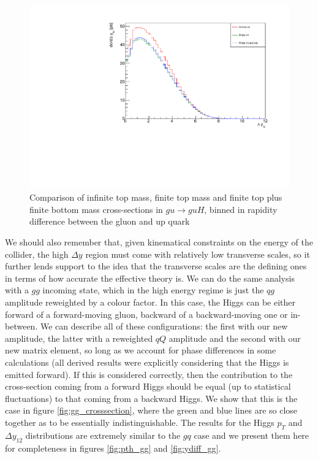 \begin{figure}[H]
\centering
\includegraphics[scale=0.75]{Images/ydiff_gu.pdf}
\caption{Comparison of infinite top mass, finite top mass and finite top plus finite bottom mass cross-sections in $gu \to guH$, binned in rapidity difference between the gluon and up quark}
\label{fig:higgs_ydiff}
\end{figure}

We should also remember that, given kinematical constraints on the energy of the collider, the high $\Delta y$ region must come with relatively low transverse scales, so it further lends support to the idea that the transverse scales are the defining ones in terms of how accurate the effective theory is. We can do the same analysis with a $gg$ incoming state, which in the high energy regime is just the $qg$ amplitude reweighted by a colour factor. In this case, the Higgs can be either forward of a forward-moving gluon, backward of a backward-moving one or in-between. We can describe all of these configurations: the first with our new amplitude, the latter with a reweighted $qQ$ amplitude and the second with our new matrix element, so long as we account for phase differences in some calculations (all derived results were explicitly considering that the Higgs is emitted forward). If this is considered correctly, then the contribution to the cross-section coming from a forward Higgs should be equal (up to statistical fluctuations) to that coming from a backward Higgs. We show that this is the case in figure \ref{fig:gg_crosssection}, where the green and blue lines are so close together as to be essentially indistinguishable. The results for the Higgs $p_T$ and $\Delta y_{12}$ distributions are extremely similar to the $gq$ case and we present them here for completeness in figures \ref{fig:pth_gg} and \ref{fig:ydiff_gg}.  


